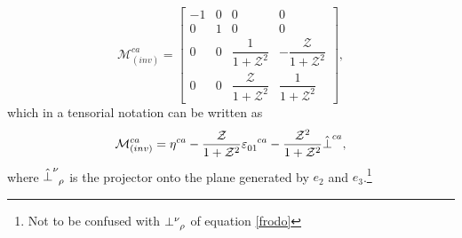 \documentclass[usenatbib%
]{mnras}
\begin{document}
\begin{equation}
\mathcal{M}^{ca}_{(inv)} =
\begin{bmatrix}
  -1  & 0 &  0 &  0  \\
   0 & 1 & 0 & 0  \\
   0 & 0 & \dfrac{1}{1+\mathcal{Z}^2} & -\dfrac{\mathcal{Z}}{1+\mathcal{Z}^2}  \\
   0 & 0 & \dfrac{\mathcal{Z}}{1+\mathcal{Z}^2} & \dfrac{1}{1+\mathcal{Z}^2}
\end{bmatrix},
\end{equation}
which in a tensorial notation can be written as
\begin{equation}\label{chepotenzalaGR}
\mathcal{M}_{(inv)}^{ca} = \eta^{ca} - \dfrac{\mathcal{Z}}{1+ \mathcal{Z}^2} \varepsilon\indices{_0_1^c^a} - \dfrac{\mathcal{Z}^2}{1+\mathcal{Z}^2} \hat{\perp}^{ca},
\end{equation}
where $\hat{\perp}\indices{^\nu _\rho}$ is the projector onto the plane generated by $e_2$ and $e_3$.\footnote{Not to be confused with $\perp\indices{^\nu _\rho}$ of equation \eqref{frodo}}
\end{document}
